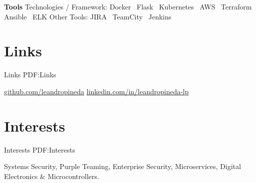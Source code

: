 \documentclass[letterpaper,MMMyyyy,nonstop]{simpleresumecv}
\begin{document}
\begin{body}
\textbf{Tools}
\BulletItem
Technologies / Framework: Docker \SubBulletSymbol\, Flask \SubBulletSymbol\, Kubernetes \SubBulletSymbol\, AWS
\SubBulletSymbol\, Terraform \SubBulletSymbol\, Ansible \SubBulletSymbol\, ELK \BulletItem
Other Tools: JIRA \SubBulletSymbol\, TeamCity \SubBulletSymbol\, Jenkins


\section
{Links}
{Links}
{PDF:Links}

\BulletItem
\href{https://github.com/leandropineda}{github.com/leandropineda}
\BulletItem
\href{https://www.linkedin.com/in/leandropineda-lp}{linkedin.com/in/leandropineda-lp}


\section
{Interests}
{Interests}
{PDF:Interests}

Systems Security, Purple Teaming, Enterprise Security, Microservices, Digital Electronics \& Microcontrollers.


%



\end{body}
\end{document}
